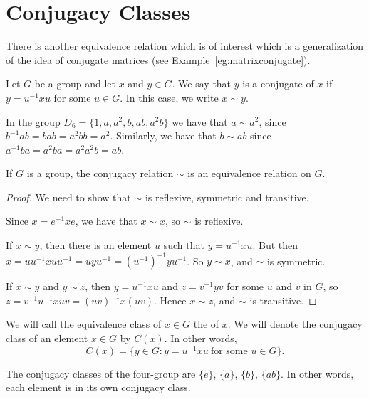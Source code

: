 \section{Conjugacy Classes}

There is another equivalence relation which is of interest which is a
generalization of the idea of conjugate matrices (see
Example~\ref{eg:matrixconjugate}).

\begin{definition}
  Let $G$ be a group and let $x$ and $y \in G$.  We say that $y$ is a
  conjugate of $x$ if $y = u^{-1}xu$ for some $u \in G$.  In this case, we
  write $x \sim y$.
\end{definition}

\begin{example}
  In the group $D_{6} = \{1, a, a^{2}, b, ab, a^{2}b\}$ we have that $a \sim
  a^{2}$, since $b^{-1}ab = bab = a^{2}bb = a^{2}$.  Similarly, we have that
  $b \sim ab$ since $a^{-1}ba = a^{2}ba = a^{2}a^{2}b = ab$.
\end{example}

\begin{proposition}
  If $G$ is a group, the conjugacy relation $\sim$ is an equivalence
  relation on $G$.
\end{proposition}
\begin{proof}
  We need to show that $\sim$ is reflexive, symmetric and transitive.
  
  Since $x = e^{-1}xe$, we have that $x \sim x$, so $\sim$ is reflexive.
  
  If $x \sim y$, then there is an element $u$ such that $y = u^{-1}xu$.  But
  then $x = uu^{-1}xuu^{-1} = uyu^{-1} = (u^{-1})^{-1}yu^{-1}$.  So $y \sim
  x$, and $\sim$ is symmetric.
  
  If $x \sim y$ and $y \sim z$, then $y = u^{-1}xu$ and $z = v^{-1}yv$ for
  some $u$ and $v$ in $G$, so $z = v^{-1}u^{-1}xuv = (uv)^{-1}x(uv)$. Hence
  $x \sim z$, and $\sim$ is transitive.
\end{proof}

We will call the equivalence class of $x \in G$ the  of $x$.  We will denote the conjugacy class 
of an element $x \in G$ by $C(x)$.  In other words,
\[
  C(x) = \{ y \in G: y = u^{-1}xu~\text{for some $u \in G$} \}.
\]

\begin{example}
  The conjugacy classes of the four-group are $\{e\}$, $\{a\}$, $\{b\}$,
  $\{ab\}$.  In other words, each element is in its own conjugacy class.
\end{example}

